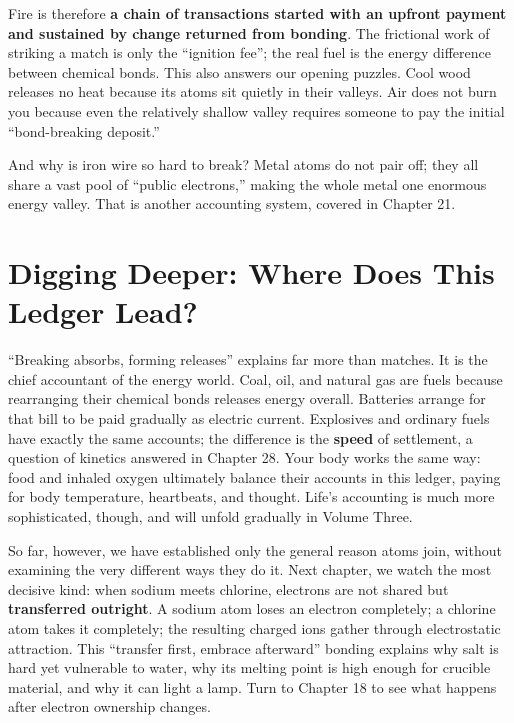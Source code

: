 Fire is therefore \textbf{a chain of transactions started with an upfront payment and sustained by change returned from bonding}. The frictional work of striking a match is only the ``ignition fee''; the real fuel is the energy difference between chemical bonds. This also answers our opening puzzles. Cool wood releases no heat because its atoms sit quietly in their valleys. Air does not burn you because even the relatively shallow  valley requires someone to pay the initial ``bond-breaking deposit.''

And why is iron wire so hard to break? Metal atoms do not pair off; they all share a vast pool of ``public electrons,'' making the whole metal one enormous energy valley. That is another accounting system, covered in Chapter 21.

\section{Digging Deeper: Where Does This Ledger Lead?}

``Breaking absorbs, forming releases'' explains far more than matches. It is the chief accountant of the energy world. Coal, oil, and natural gas are fuels because rearranging their chemical bonds releases energy overall. Batteries arrange for that bill to be paid gradually as electric current. Explosives and ordinary fuels have exactly the same accounts; the difference is the \textbf{speed} of settlement, a question of kinetics answered in Chapter 28. Your body works the same way: food and inhaled oxygen ultimately balance their accounts in this ledger, paying for body temperature, heartbeats, and thought. Life's accounting is much more sophisticated, though, and will unfold gradually in Volume Three.

So far, however, we have established only the general reason atoms join, without examining the very different ways they do it. Next chapter, we watch the most decisive kind: when sodium meets chlorine, electrons are not shared but \textbf{transferred outright}. A sodium atom loses an electron completely; a chlorine atom takes it completely; the resulting charged ions gather through electrostatic attraction. This ``transfer first, embrace afterward'' bonding explains why salt is hard yet vulnerable to water, why its melting point is high enough for crucible material, and why it can light a lamp. Turn to Chapter 18 to see what happens after electron ownership changes.


